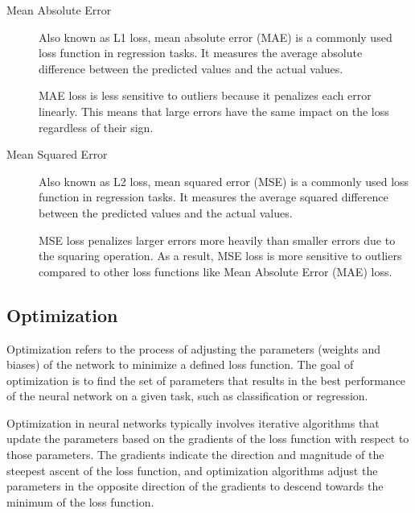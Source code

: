 \documentclass[a4paper]{article}
\begin{document}
\begin{description}
\item[Mean Absolute Error]
Also known as L1 loss, mean absolute error (MAE) is a commonly used loss function in regression tasks. It measures the average absolute difference between the predicted values and the actual values.

MAE loss is less sensitive to outliers because it penalizes each error linearly. This means that large errors have the same impact on the loss regardless of their sign. 

\item[Mean Squared Error]
Also known as L2 loss, mean squared error (MSE) is a commonly used loss function in regression tasks. It measures the average squared difference between the predicted values and the actual values.

MSE loss penalizes larger errors more heavily than smaller errors due to the squaring operation. As a result, MSE loss is more sensitive to outliers compared to other loss functions like Mean Absolute Error (MAE) loss.
\end{description}

%
%

\subsection*{Optimization}
Optimization refers to the process of adjusting the parameters (weights and biases) of the network to minimize a defined loss function. The goal of optimization is to find the set of parameters that results in the best performance of the neural network on a given task, such as classification or regression.

Optimization in neural networks typically involves iterative algorithms that update the parameters based on the gradients of the loss function with respect to those parameters. The gradients indicate the direction and magnitude of the steepest ascent of the loss function, and optimization algorithms adjust the parameters in the opposite direction of the gradients to descend towards the minimum of the loss function.
\end{document}
